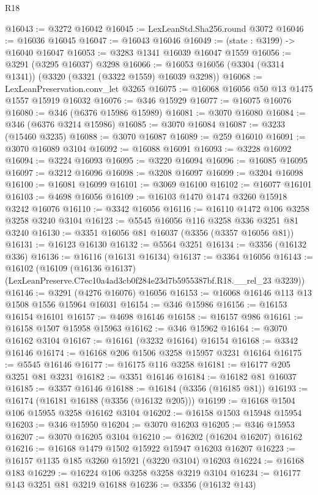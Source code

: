 \begin{lexlean}{R18}
\begin{coremodule}
@16043 := @3272 @16042
@16045 := LexLeanStd.Sha256.round @3072
@16046 := @16036 @16045
@16047 := @16043 @16046
@16049 := (state : @3199) -> @16040 @16047
@16053 := @3283 @1341 @16039 @16047 @1559
@16056 := @3291 (@3295 @16037) @3298
@16066 := @16053 @16056 (@3304 (@3314 @1341)) (@3320 (@3321 (@3322 @1559) @16039 @3298))
@16068 := LexLeanPreservation.conv_let @3265
@16075 := @16068 @16056 @50 @13 @1475 @1557 @15919 @16032
@16076 := @346 @15929
@16077 := @16075 @16076
@16080 := @346 (@6376 @15986 @15989)
@16081 := @3070 @16080
@16084 := @346 (@6376 @3214 @15986)
@16085 := @3070 @16084
@16087 := @3233 (@15460 @3235)
@16088 := @3070 @16087
@16089 := @259 @16010
@16091 := @3070 @16089 @3104
@16092 := @16088 @16091
@16093 := @3228 @16092
@16094 := @3224 @16093
@16095 := @3220 @16094
@16096 := @16085 @16095
@16097 := @3212 @16096
@16098 := @3208 @16097
@16099 := @3204 @16098
@16100 := @16081 @16099
@16101 := @3069 @16100
@16102 := @16077 @16101
@16103 := @4698 @16056
@16109 := @16103 @1470 @1474 @3260 @15918 @3242 @16076
@16110 := @3342 @16056
@16116 := @16110 @1472 @106 @3258 @3258 @3240 @3104
@16123 := @5545 @16056 @116 @3258 @336 @3251 @81 @3240
@16130 := @3351 @16056 @81 @16037 (@3356 (@3357 @16056 @81))
@16131 := @16123 @16130
@16132 := @5564 @3251
@16134 := @3356 (@16132 @336)
@16136 := @16116 (@16131 @16134)
@16137 := @3364 @16056
@16143 := @16102
    (@16109 (@16136 @16137) (LexLeanPreserve.C7ec10a4ad3cb0f284e23d7b5955387bf.R18.__rel_23 @3239))
@16146 := @3291 (@4276 @16076) @16056
@16153 := @16068 @16146 @113 @13 @1508 @1556 @15964 @16031
@16154 := @346 @15986
@16156 := @16153 @16154 @16101
@16157 := @4698 @16146
@16158 := @16157 @986
@16161 := @16158 @1507 @15958 @15963
@16162 := @346 @15962
@16164 := @3070 @16162 @3104
@16167 := @16161 (@3232 @16164) @16154
@16168 := @3342 @16146
@16174 := @16168 @206 @1506 @3258 @15957 @3231 @16164
@16175 := @5545 @16146
@16177 := @16175 @116 @3258
@16181 := @16177 @205 @3251 @81 @3231
@16182 := @3351 @16146
@16184 := @16182 @81 @16037
@16185 := @3357 @16146
@16188 := @16184 (@3356 (@16185 @81))
@16193 := @16174 (@16181 @16188 (@3356 (@16132 @205)))
@16199 := @16168 @1504 @106 @15955 @3258 @16162 @3104
@16202 := @16158 @1503 @15948 @15954
@16203 := @346 @15950
@16204 := @3070 @16203
@16205 := @346 @15953
@16207 := @3070 @16205 @3104
@16210 := @16202 (@16204 @16207) @16162
@16216 := @16168 @1479 @1502 @15922 @15947 @16203 @16207
@16223 := @16157 @1135 @185 @3260 @15921 (@3220 @3104) @16203
@16224 := @16168 @183
@16229 := @16224 @106 @3258 @3258 @3219 @3104
@16234 := @16177 @143 @3251 @81 @3219 @16188
@16236 := @3356 (@16132 @143)

\end{coremodule}
\end{lexlean}
